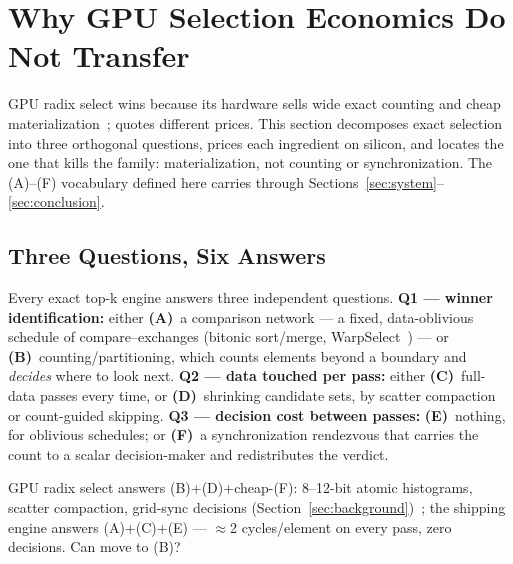 \section{Why GPU Selection Economics Do Not Transfer}
\label{sec:design-space}

GPU radix select wins because its hardware sells wide exact counting and
cheap
materialization~\cite{alabi2012kselection,gaihre2021drtopk,zhang2023paralleltopk,li2024radik};
\bh quotes different prices. This section decomposes exact selection into
three orthogonal questions, prices each ingredient on silicon, and
locates the one that kills the family: materialization, not counting or
synchronization. The (A)--(F) vocabulary defined here carries through
Sections~\ref{sec:system}--\ref{sec:conclusion}.

\subsection{Three Questions, Six Answers}
\label{sec:dspace-map}

Every exact top-k engine answers three independent questions.
\textbf{Q1 --- winner identification:} either \textbf{(A)}~a comparison
network --- a fixed, data-oblivious schedule of compare--exchanges
(bitonic sort/merge, WarpSelect~\cite{johnson2019billion}) --- or
\textbf{(B)}~counting/partitioning, which counts elements beyond a
boundary and \emph{decides} where to look next.
\textbf{Q2 --- data touched per pass:} either \textbf{(C)}~full-data
passes every time, or \textbf{(D)}~shrinking candidate sets, by scatter
compaction or count-guided skipping.
\textbf{Q3 --- decision cost between passes:} \textbf{(E)}~nothing, for
oblivious schedules; or \textbf{(F)}~a synchronization rendezvous that
carries the count to a scalar decision-maker and redistributes the
verdict.

GPU radix select answers (B)+(D)+cheap-(F): 8--12-bit atomic histograms,
scatter compaction, grid-sync decisions
(Section~\ref{sec:background})~\cite{alabi2012kselection,li2024radik};
the shipping \bh engine answers (A)+(C)+(E) --- $\approx$2 cycles/element
on every pass, zero decisions. Can \bh move to (B)?

